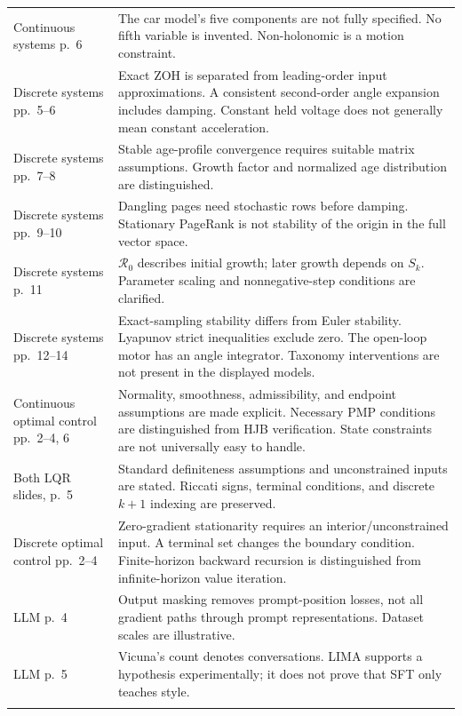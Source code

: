 \documentclass[11pt,a4paper]{article}
\numberwithin{equation}{section}
\numberwithin{figure}{section}
\numberwithin{table}{section}
\begin{document}
\begin{longtable}{@{}P{33mm}P{116mm}@{}}
Continuous systems p.\ 6 & The car model's five components are not fully specified. No fifth variable is invented. Non-holonomic is a motion constraint.\\\addlinespace
Discrete systems pp.\ 5--6 & Exact ZOH is separated from leading-order input approximations. A consistent second-order angle expansion includes damping. Constant held voltage does not generally mean constant acceleration.\\\addlinespace
Discrete systems pp.\ 7--8 & Stable age-profile convergence requires suitable matrix assumptions. Growth factor and normalized age distribution are distinguished.\\\addlinespace
Discrete systems pp.\ 9--10 & Dangling pages need stochastic rows before damping. Stationary PageRank is not stability of the origin in the full vector space.\\\addlinespace
Discrete systems p.\ 11 & $\mathcal R_0$ describes initial growth; later growth depends on $S_k$. Parameter scaling and nonnegative-step conditions are clarified.\\\addlinespace
Discrete systems pp.\ 12--14 & Exact-sampling stability differs from Euler stability. Lyapunov strict inequalities exclude zero. The open-loop motor has an angle integrator. Taxonomy interventions are not present in the displayed models.\\\addlinespace
Continuous optimal control pp.\ 2--4, 6 & Normality, smoothness, admissibility, and endpoint assumptions are made explicit. Necessary PMP conditions are distinguished from HJB verification. State constraints are not universally easy to handle.\\\addlinespace
Both LQR slides, p.\ 5 & Standard definiteness assumptions and unconstrained inputs are stated. Riccati signs, terminal conditions, and discrete $k+1$ indexing are preserved.\\\addlinespace
Discrete optimal control pp.\ 2--4 & Zero-gradient stationarity requires an interior/unconstrained input. A terminal set changes the boundary condition. Finite-horizon backward recursion is distinguished from infinite-horizon value iteration.\\\addlinespace
LLM p.\ 4 & Output masking removes prompt-position losses, not all gradient paths through prompt representations. Dataset scales are illustrative.\\\addlinespace
LLM p.\ 5 & Vicuna's count denotes conversations. LIMA supports a hypothesis experimentally; it does not prove that SFT only teaches style.\\\addlinespace

\end{longtable}
\end{document}
